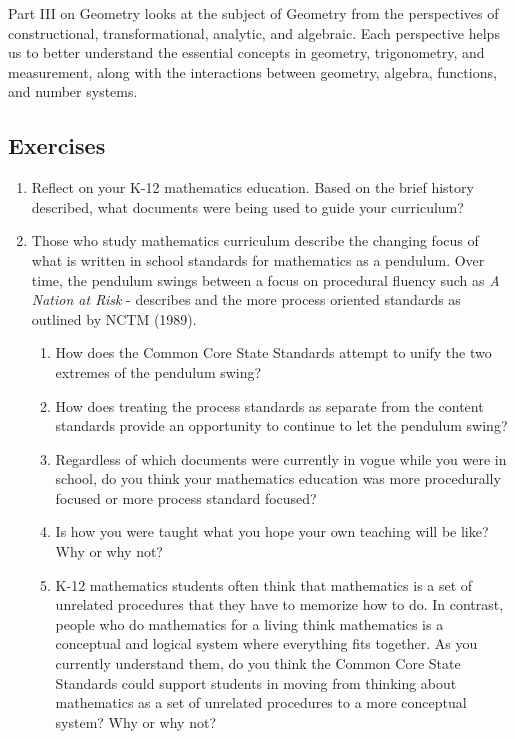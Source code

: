 \documentclass[
]{book}
\providecommand{\tightlist}{%
  \setlength{\itemsep}{0pt}\setlength{\parskip}{0pt}}
\theoremstyle{definition}
\theoremstyle{definition}
\theoremstyle{definition}
\theoremstyle{definition}
\theoremstyle{remark}
\begin{document}
Part III on Geometry looks at the subject of Geometry from the perspectives of constructional, transformational, analytic, and algebraic. Each perspective helps us to better understand the essential concepts in geometry, trigonometry, and measurement, along with the interactions between geometry, algebra, functions, and number systems.

\hypertarget{exercises-2}{%
\subsection{Exercises}\label{exercises-2}}

\begin{enumerate}
\def\labelenumi{\arabic{enumi}.}
\item
  Reflect on your K-12 mathematics education. Based on the brief history described, what documents were being used to guide your curriculum?
\item
  Those who study mathematics curriculum describe the changing focus of what is written in school standards for mathematics as a pendulum. Over time, the pendulum swings between a focus on procedural fluency such as \emph{A Nation at Risk} -\citet{NCEE1983} describes and the more process oriented standards as outlined by NCTM (1989).

  \begin{enumerate}
  \def\labelenumii{\alph{enumii})}
  \tightlist
  \item
    How does the Common Core State Standards attempt to unify the two extremes of the pendulum swing?
  \item
    How does treating the process standards as separate from the content standards provide an opportunity to continue to let the pendulum swing?
  \item
    Regardless of which documents were currently in vogue while you were in school, do you think your mathematics education was more procedurally focused or more process standard focused?
  \item
    Is how you were taught what you hope your own teaching will be like? Why or why not?
  \item
    K-12 mathematics students often think that mathematics is a set of unrelated procedures that they have to memorize how to do. In contrast, people who do mathematics for a living think mathematics is a conceptual and logical system where everything fits together. As you currently understand them, do you think the Common Core State Standards could support students in moving from thinking about mathematics as a set of unrelated procedures to a more conceptual system? Why or why not?
  \end{enumerate}
\end{enumerate}
\end{document}
